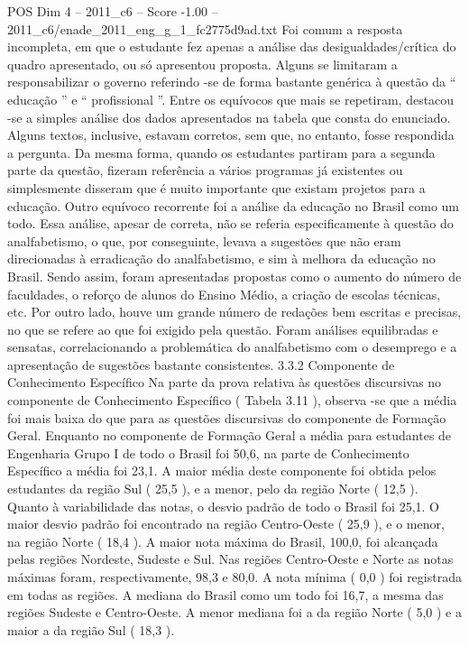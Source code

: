 \begin{textsample}{POS Dim 4 – 2011\_c6 – Score -1.00 – 2011\_c6/enade\_2011\_eng\_g\_1\_fc2775d9ad.txt}
Foi comum a resposta incompleta, em que o estudante fez apenas a análise das desigualdades/crítica do quadro apresentado, ou só apresentou proposta.
Alguns se limitaram a responsabilizar o governo referindo -se de forma bastante genérica à questão da “ educação ” e “ profissional ”.
Entre os equívocos que mais se repetiram, destacou -se a simples análise dos dados apresentados na tabela que consta do enunciado.
Alguns textos, inclusive, estavam corretos, sem que, no entanto, fosse respondida a pergunta.
Da mesma forma, quando os estudantes partiram para a segunda parte da questão, fizeram referência a vários programas já existentes ou simplesmente disseram que é muito importante que existam projetos para a educação.
Outro equívoco recorrente foi a análise da educação no Brasil como um todo.
Essa análise, apesar de correta, não se referia especificamente à questão do analfabetismo, o que, por conseguinte, levava a sugestões que não eram direcionadas à erradicação do analfabetismo, e sim à melhora da educação no Brasil.
Sendo assim, foram apresentadas propostas como o aumento do número de faculdades, o reforço de alunos do Ensino Médio, a criação de escolas técnicas, etc.
Por outro lado, houve um grande número de redações bem escritas e precisas, no que se refere ao que foi exigido pela questão.
Foram análises equilibradas e sensatas, correlacionando a problemática do analfabetismo com o desemprego e a apresentação de sugestões bastante consistentes. 3.3.2 Componente de Conhecimento Específico Na parte da prova relativa às questões discursivas no componente de Conhecimento Específico ( Tabela 3.11 ), observa -se que a média foi mais baixa do que para as questões discursivas do componente de Formação Geral.
Enquanto no componente de Formação Geral a média para estudantes de Engenharia Grupo I de todo o Brasil foi 50,6, na parte de Conhecimento Específico a média foi 23,1.
A maior média deste componente foi obtida pelos estudantes da região Sul ( 25,5 ), e a menor, pelo da região Norte ( 12,5 ).
Quanto à variabilidade das notas, o desvio padrão de todo o Brasil foi 25,1.
O maior desvio padrão foi encontrado na região Centro-Oeste ( 25,9 ), e o menor, na região Norte ( 18,4 ).
A maior nota máxima do Brasil, 100,0, foi alcançada pelas regiões Nordeste, Sudeste e Sul.
Nas regiões Centro-Oeste e Norte as notas máximas foram, respectivamente, 98,3 e 80,0.
A nota mínima ( 0,0 ) foi registrada em todas as regiões.
A mediana do Brasil como um todo foi 16,7, a mesma das regiões Sudeste e Centro-Oeste.
A menor mediana foi a da região Norte ( 5,0 ) e a maior a da região Sul ( 18,3 ).

\end{textsample}
